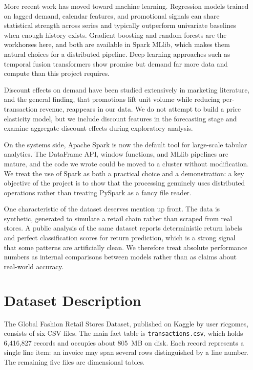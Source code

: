 \documentclass[11pt,a4paper]{article}
\begin{document}
More recent work has moved toward machine learning. Regression models trained on lagged demand, calendar features, and promotional signals can share statistical strength across series and typically outperform univariate baselines when enough history exists. Gradient boosting and random forests are the workhorses here, and both are available in Spark MLlib, which makes them natural choices for a distributed pipeline. Deep learning approaches such as temporal fusion transformers show promise but demand far more data and compute than this project requires.

Discount effects on demand have been studied extensively in marketing literature, and the general finding, that promotions lift unit volume while reducing per-transaction revenue, reappears in our data. We do not attempt to build a price elasticity model, but we include discount features in the forecasting stage and examine aggregate discount effects during exploratory analysis.

On the systems side, Apache Spark is now the default tool for large-scale tabular analytics. The DataFrame API, window functions, and MLlib pipelines are mature, and the code we wrote could be moved to a cluster without modification. We treat the use of Spark as both a practical choice and a demonstration: a key objective of the project is to show that the processing genuinely uses distributed operations rather than treating PySpark as a fancy file reader.

One characteristic of the dataset deserves mention up front. The data is synthetic, generated to simulate a retail chain rather than scraped from real stores. A public analysis of the same dataset reports deterministic return labels and perfect classification scores for return prediction, which is a strong signal that some patterns are artificially clean. We therefore treat absolute performance numbers as internal comparisons between models rather than as claims about real-world accuracy.

\section{Dataset Description}\label{sec:dataset}

The Global Fashion Retail Stores Dataset, published on Kaggle by user ricgomes, consists of six CSV files. The main fact table is \texttt{transactions.csv}, which holds 6,416,827 records and occupies about 805~MB on disk. Each record represents a single line item: an invoice may span several rows distinguished by a line number. The remaining five files are dimensional tables.
\end{document}
